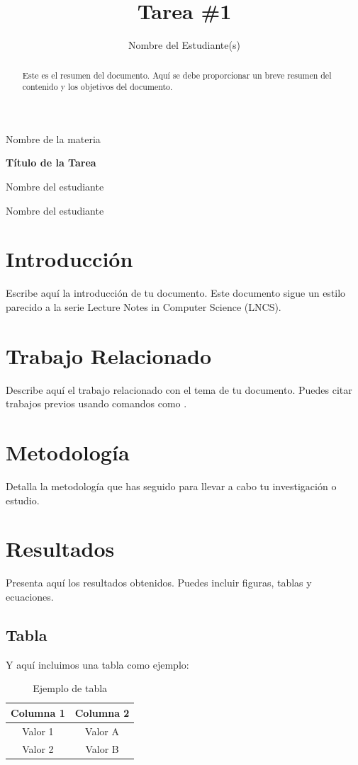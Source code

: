 \documentclass[11pt, letterpaper, twoside, openright]{article}
\title{Tarea \#1}
\author{Nombre del Estudiante(s)}
\date{}
\begin{document}
\vspace*{10pt}
\centering
\huge
Nombre de la materia

\LARGE
\textbf{Título de la Tarea}

\Large
Nombre del estudiante

Nombre del estudiante

\normalsize
\justifying

\begin{abstract}
Este es el resumen del documento. Aquí se debe proporcionar un breve resumen del contenido y los objetivos del documento.
\end{abstract}


\section{Introducción}
Escribe aquí la introducción de tu documento. Este documento sigue un estilo parecido a la serie Lecture Notes in Computer Science (LNCS).

\section{Trabajo Relacionado}
Describe aquí el trabajo relacionado con el tema de tu documento. Puedes citar trabajos previos usando comandos como \cite{lamport1994latex}.

\section{Metodología}
Detalla la metodología que has seguido para llevar a cabo tu investigación o estudio.

\section{Resultados}
Presenta aquí los resultados obtenidos. Puedes incluir figuras, tablas y ecuaciones.

\subsection{Tabla}
Y aquí incluimos una tabla como ejemplo:

\begin{table}[htbp]
  \centering
  \caption{Ejemplo de tabla}
  \label{tab:ejemplo}
  \begin{tabular}{|c|c|}
    \hline
    \textbf{Columna 1} & \textbf{Columna 2} \\
    \hline
    Valor 1 & Valor A \\
    Valor 2 & Valor B \\
    \hline
  \end{tabular}
\end{table}
\end{document}
